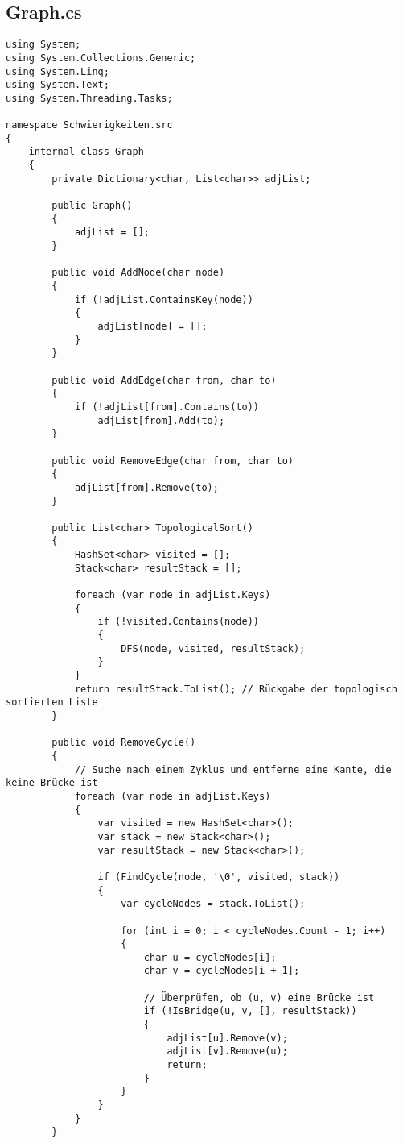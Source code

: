 \documentclass[a4paper,10pt,ngerman]{scrartcl}
\begin{document}
\subsection{Graph.cs}
\begin{verbatim}
using System;
using System.Collections.Generic;
using System.Linq;
using System.Text;
using System.Threading.Tasks;

namespace Schwierigkeiten.src
{
    internal class Graph
    {
        private Dictionary<char, List<char>> adjList;

        public Graph()
        {
            adjList = [];
        }

        public void AddNode(char node)
        {
            if (!adjList.ContainsKey(node))
            {
                adjList[node] = [];
            }
        }

        public void AddEdge(char from, char to)
        {
            if (!adjList[from].Contains(to))
                adjList[from].Add(to);
        }

        public void RemoveEdge(char from, char to)
        {
            adjList[from].Remove(to);
        }

        public List<char> TopologicalSort()
        {
            HashSet<char> visited = [];
            Stack<char> resultStack = [];

            foreach (var node in adjList.Keys)
            {
                if (!visited.Contains(node))
                {
                    DFS(node, visited, resultStack);
                }
            }
            return resultStack.ToList(); // Rückgabe der topologisch sortierten Liste
        }

        public void RemoveCycle()
        {
            // Suche nach einem Zyklus und entferne eine Kante, die keine Brücke ist
            foreach (var node in adjList.Keys)
            {
                var visited = new HashSet<char>();
                var stack = new Stack<char>();
                var resultStack = new Stack<char>();

                if (FindCycle(node, '\0', visited, stack))
                {
                    var cycleNodes = stack.ToList();

                    for (int i = 0; i < cycleNodes.Count - 1; i++)
                    {
                        char u = cycleNodes[i];
                        char v = cycleNodes[i + 1];

                        // Überprüfen, ob (u, v) eine Brücke ist
                        if (!IsBridge(u, v, [], resultStack))
                        {
                            adjList[u].Remove(v);
                            adjList[v].Remove(u);
                            return;
                        }
                    }
                }
            }
        }


\end{verbatim}
\end{document}
